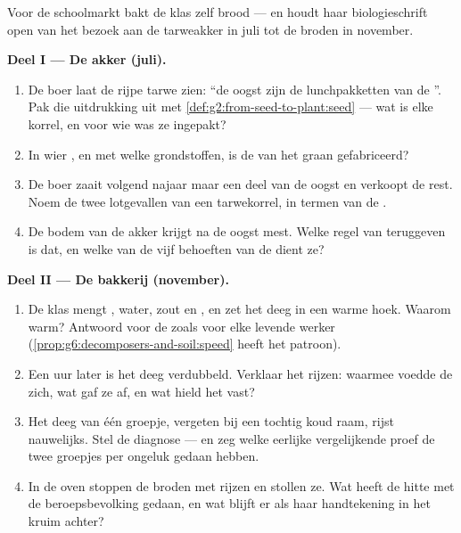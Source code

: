 \begin{problem}\label{pb:g6:producing-our-food:1}
Voor de schoolmarkt bakt de klas zelf brood --- en houdt haar
biologieschrift open van het bezoek aan de tarweakker in juli tot de
broden in november.

\medskip\noindent\textbf{Deel I --- De akker (juli).}
\begin{enumerate}
  \item De boer laat de rijpe tarwe zien: ``de oogst zijn de
        lunchpakketten van de ''. Pak die uitdrukking uit met
        \cref{def:g2:from-seed-to-plant:seed} --- wat is elke korrel, en
        voor wie was ze ingepakt?
  \item In wier , en met welke grondstoffen, is de  van het graan gefabriceerd?
  \item De boer zaait volgend najaar maar een deel van de oogst en
        verkoopt de rest. Noem de twee lotgevallen van een tarwekorrel,
        in termen van de .
  \item De bodem van de akker krijgt na de oogst mest. Welke regel van
        teruggeven is dat, en welke van de vijf behoeften van de 
        dient ze?
\end{enumerate}

\medskip\noindent\textbf{Deel II --- De bakkerij (november).}
\begin{enumerate}[resume]
  \item De klas mengt , water, zout en , en zet het deeg in een
        warme hoek. Waarom warm? Antwoord voor de  zoals voor elke
        levende werker (\cref{prop:g6:decomposers-and-soil:speed} heeft
        het patroon).
  \item Een uur later is het deeg verdubbeld. Verklaar het rijzen:
        waarmee voedde de  zich, wat gaf ze af, en wat hield het
        vast?
  \item Het deeg van één groepje, vergeten bij een tochtig koud raam,
        rijst nauwelijks. Stel de diagnose --- en zeg welke eerlijke
        vergelijkende proef de twee groepjes per ongeluk gedaan hebben.
  \item In de oven stoppen de broden met rijzen en stollen ze. Wat heeft
        de hitte met de beroepsbevolking gedaan, en wat blijft er als
        haar handtekening in het kruim achter?
\end{enumerate}


\end{problem}
